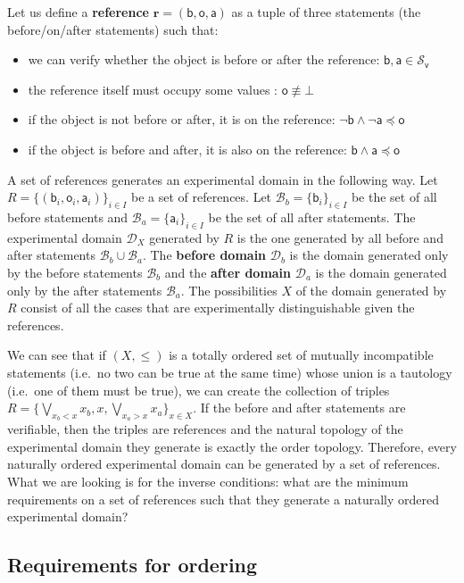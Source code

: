 \documentclass[submission,copyright,creativecommons]{eptcs}
\def\AND{\wedge}
\def\bigOR{\bigvee}
\def\NOT{\neg}
\def\vstmtSet{\mathcal{S}_\textsf{v}}
\def\contradiction{\bot} %
\newcommand{\stmt}[1][s] {\mathsf{#1}} %
\def\narrower{\preccurlyeq} %
\newcommand{\edomain}[1][D] {\mathcal{#1}} %
\newcommand{\basis}[1][B] {\mathcal{#1}} %
\newcommand{\refStmt}[1][r]{\textbf{#1}}
\begin{document}
Let us define a \textbf{reference} $\refStmt = ( \stmt[b], \stmt[o], \stmt[a] )$ as a tuple of three statements (the before/on/after statements) such that:
\begin{itemize}
	\item we can verify whether the object is before or after the reference: $\stmt[b], \stmt[a] \in \vstmtSet$
	\item the reference itself must occupy some values : $\stmt[o] \nequiv \contradiction$
	\item if the object is not before or after, it is on the reference: $\NOT \stmt[b] \AND \NOT \stmt[a] \narrower \stmt[o]$
	\item if the object is before and after, it is also on the reference: $\stmt[b] \AND \stmt[a] \narrower \stmt[o]$
\end{itemize}
A set of references generates an experimental domain in the following way. Let $R = \{( \stmt[b]_i, \stmt[o]_i, \stmt[a]_i )\}_{i \in I}$ be a set of references. Let $\basis_b = \{\stmt[b]_i\}_{i \in I}$ be the set of all before statements and $\basis_a = \{\stmt[a]_i\}_{i \in I}$ be the set of all after statements. The experimental domain $\edomain_X$ generated by $R$ is the one generated by all before and after statements $\basis_b \cup \basis_a$. The \textbf{before domain} $\edomain_b$ is the domain generated only by the before statements $\basis_b$ and the \textbf{after domain} $\edomain_a$ is the domain generated only by the after statements $\basis_a$. The possibilities $X$ of the domain generated by $R$ consist of all the cases that are experimentally distinguishable given the references.

We can see that if $(X, \leq)$ is a totally ordered set of mutually incompatible statements (i.e.~no two can be true at the same time) whose union is a tautology (i.e.~one of them must be true), we can create the collection of triples $R = \{ \bigOR\limits_{x_b < x} x_b , x , \bigOR\limits_{x_a > x} x_a \}_{x \in X}$. If the before and after statements are verifiable, then the triples are references and the natural topology of the experimental domain they generate is exactly the order topology. Therefore, every naturally ordered experimental domain can be generated by a set of references. What we are looking is for the inverse conditions: what are the minimum requirements on a set of references such that they generate a naturally ordered experimental domain?

\subsection*{Requirements for ordering}
\end{document}
